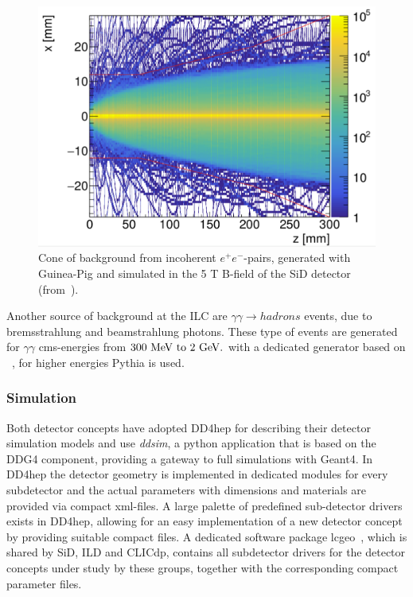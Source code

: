 \begin{figure}
\begin{center}
\includegraphics[width=0.90\hsize]{chapters/figures/pair_bg_cone_SiD.png}
\end{center}
\caption{Cone of background from incoherent $e^+e^-$-pairs, generated with Guinea-Pig and simulated in the 5 T B-field of the SiD
  detector (from~\cite{Schutz:2017ihd}).}
\label{fig:pair_bg}
\end{figure}

Another source of background at the ILC are $\gamma \gamma \rightarrow hadrons$ events, due to bremsstrahlung and beamstrahlung photons.
These type of events are generated for $\gamma \gamma$ cms-energies from $300~\rm{MeV~to} ~2~\rm{GeV}.$ with a dedicated generator based
on ~\cite{Chen:1993dba}, for higher energies Pythia is used.


\subsubsection{Simulation}

Both detector concepts have adopted DD4hep for describing their detector simulation models and use \emph{ddsim}, a python application that
is based on the DDG4 component, providing a gateway to full simulations with Geant4.
In DD4hep the detector geometry is implemented in dedicated \CPP modules for every subdetector and the actual parameters with dimensions
and materials are provided via compact xml-files. A large palette of predefined sub-detector drivers exists in DD4hep, allowing for an
easy implementation of a new detector concept by providing suitable compact files.
A dedicated software package lcgeo~\cite{bib:lcgeo}, which is shared by SiD, ILD and CLICdp, contains all subdetector drivers for the
detector concepts under study by these groups, together with the corresponding compact parameter files.


